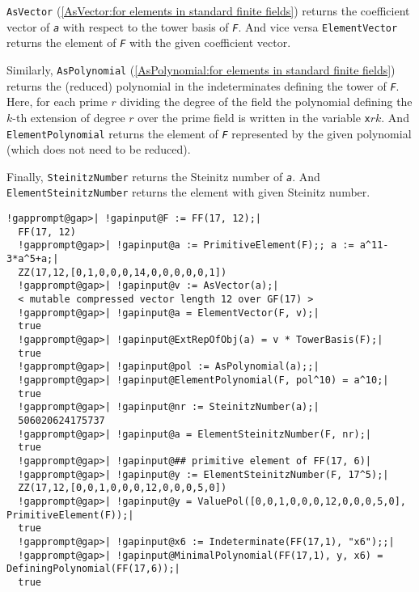 \documentclass[a4paper,11pt]{report}
\begin{document}
{{{ \texttt{AsVector} (\ref{AsVector:for elements  in standard finite fields}) returns the coefficient vector of \mbox{\texttt{\mdseries\slshape a}} with respect to the tower basis of \mbox{\texttt{\mdseries\slshape F}}. And vice versa \texttt{ElementVector} returns the element of \mbox{\texttt{\mdseries\slshape F}} with the given coefficient vector. 

 Similarly, \texttt{AsPolynomial} (\ref{AsPolynomial:for elements  in standard
finite   fields}) returns the (reduced) polynomial in the indeterminates defining the tower of \mbox{\texttt{\mdseries\slshape F}}. Here, for each prime $r$ dividing the degree of the field the polynomial defining the $k$-th extension of degree $r$ over the prime field is written in the variable \texttt{x}$r$\texttt{{\textunderscore}}$k$. And \texttt{ElementPolynomial} returns the element of \mbox{\texttt{\mdseries\slshape F}} represented by the given polynomial (which does not need to be reduced). 

 Finally, \texttt{SteinitzNumber} returns the Steinitz number of \mbox{\texttt{\mdseries\slshape a}}. And \texttt{ElementSteinitzNumber} returns the element with given Steinitz number. 
\begin{Verbatim}[commandchars=!@|,fontsize=\small,frame=single,label=Example]
  !gapprompt@gap>| !gapinput@F := FF(17, 12);|
  FF(17, 12)
  !gapprompt@gap>| !gapinput@a := PrimitiveElement(F);; a := a^11-3*a^5+a;|
  ZZ(17,12,[0,1,0,0,0,14,0,0,0,0,0,1])
  !gapprompt@gap>| !gapinput@v := AsVector(a);|
  < mutable compressed vector length 12 over GF(17) >
  !gapprompt@gap>| !gapinput@a = ElementVector(F, v);|
  true
  !gapprompt@gap>| !gapinput@ExtRepOfObj(a) = v * TowerBasis(F);|
  true
  !gapprompt@gap>| !gapinput@pol := AsPolynomial(a);;|
  !gapprompt@gap>| !gapinput@ElementPolynomial(F, pol^10) = a^10;|
  true
  !gapprompt@gap>| !gapinput@nr := SteinitzNumber(a);|
  506020624175737
  !gapprompt@gap>| !gapinput@a = ElementSteinitzNumber(F, nr);|
  true
  !gapprompt@gap>| !gapinput@## primitive element of FF(17, 6)|
  !gapprompt@gap>| !gapinput@y := ElementSteinitzNumber(F, 17^5);|
  ZZ(17,12,[0,0,1,0,0,0,12,0,0,0,5,0])
  !gapprompt@gap>| !gapinput@y = ValuePol([0,0,1,0,0,0,12,0,0,0,5,0], PrimitiveElement(F));|
  true
  !gapprompt@gap>| !gapinput@x6 := Indeterminate(FF(17,1), "x6");;|
  !gapprompt@gap>| !gapinput@MinimalPolynomial(FF(17,1), y, x6) = DefiningPolynomial(FF(17,6));|
  true
\end{Verbatim}
 }

 }

 
}
\end{document}

